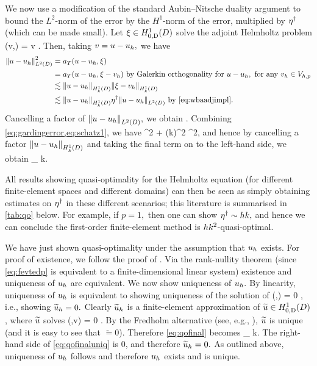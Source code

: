 We now use a modification of the standard Aubin--Nitsche duality argument to bound the $L^2$-norm of the error by the $H^1$-norm of the error, multiplied by $\eta^{\dagger}$ (which can be made small). Let $\xi \in \HozDD$ solve the adjoint Helmholtz problem
\beq\label{eq:xidef}
\aT(v,\xi) =  \tforall v \in \HozDD.
\eeq
Then, taking $v = u-u_{h},$ we have
\begin{align}
  \NLtD{u-\uh}^2 &= \aT(u-\uh,\xi)\label{eq:schatz0}\\
  &=\aT(u-\uh,\xi - \vh) \text{ by Galerkin orthogonality for } u-\uh, \text{ for any } \vh \in \Vhp\nonumber\\
  &\lesssim \NHokD{u-\uh}\NHokD{\xi-\vh}\nonumber\\
  &\lesssim \NHokD{u-\uh} \wbaadj \NLtD{u-\uh}\text{ by \cref{eq:wbaadjimpl}.}\nonumber
\end{align}
Cancelling a factor of $\NLtD{u-\uh},$ we obtain
\beq\label{eq:schatz1}
 \lesssim \wbaadj {}.
\eeq
Combining \cref{eq:gardingerror,eq:schatz1}, we have
\beqs
{}^2 \lesssim {} + \mleft(k\wbaadj\mright)^2 ^2,
\eeqs
and hence by cancelling a factor $\NHokD{u-\uh}$ and taking the final term on to the left-hand side, we obtain
\beq\label{eq:qofinal}
 \lesssim \inf_{\vh \in \Vhp}  \tif k\wbaadj {}.
\eeq

All results showing quasi-optimality for the Helmholtz equation (for different finite-element spaces and different domains) can then be seen as simply obtaining estimates on $\eta^{\dagger}$ in these different scenarios; this literature is summarised in \cref{tab:qo} below. For example, if $p=1,$ then one can show $\eta^{\dagger} \sim hk,$ and hence we can conclude the first-order finite-element method is $hk^{2}$-quasi-optimal.

We have just shown quasi-optimality under the assumption that $u_{h}$ exists. For proof of existence, we follow the proof of \cite[Theorem 5.21]{Sp:15}. Via the rank-nullity theorem (since \cref{eq:fevtedp} is equivalent to a finite-dimensional linear system) existence and uniqueness of $u_{h}$ are equivalent. We now show uniqueness of $u_{h}.$ By linearity, uniqueness of $u_{h}$ is equivalent to showing uniqueness of the solution of
\beqs\label{eq:uniqproof}
\aT\mleft(\uhtilde,\vh\mright) = 0 \tforall \vh \in \Vhp,
\eeqs
i.e., showing $\widetilde{u}_{h} = 0.$ Clearly $\widetilde{u}_{h}$ is a finite-element approximation of $\utilde \in \HozDD$, where $\widetilde{u}$ solves
\beqs
\aT\mleft(\utilde,v\mright) = 0 \tforall \vh \in \Vhp.
\eeqs
By the Fredholm alternative (see, e.g., \cite[Theorem 4.2.7]{SaSc:11}), $\widetilde{u}$ is unique (and it is easy to see that $\utilde = 0$). Therefore \cref{eq:qofinal} becomes
\beq\label{eq:qofinaluniq}
\NHokD{\uhtilde} \lesssim \inf_{\vh \in \Vhp} \NHokD{\vh} \tif k\wbaadj {}.
\eeq
The right-hand side of \cref{eq:qofinaluniq} is 0, and therefore $\widetilde{u}_{h}=0.$ As outlined above, uniqueness of $u_{h}$ follows and therefore $u_{h}$ exists and is unique.

